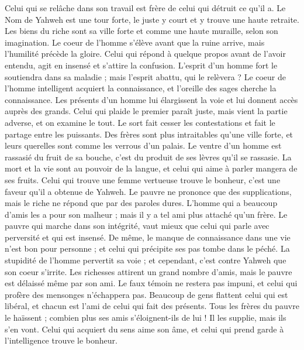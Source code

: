 \begin{multicols}{2}
Celui qui se relâche dans son travail est frère de celui qui détruit ce qu'il a.
Le Nom de Yahweh est une tour forte, le juste y court et y trouve une haute retraite.
Les biens du riche sont sa ville forte et comme une haute muraille, selon son imagination.
Le coeur de l'homme s'élève avant que la ruine arrive, mais l'humilité précède la gloire.
Celui qui répond à quelque propos avant de l'avoir entendu, agit en insensé et s’attire la confusion.
L'esprit d'un homme fort le soutiendra dans sa maladie ; mais l'esprit abattu, qui le relèvera ?
Le coeur de l'homme intelligent acquiert la connaissance, et l'oreille des sages cherche la connaissance.
Les présents d'un homme lui élargissent la voie et lui donnent accès auprès des grands.
Celui qui plaide le premier paraît juste, mais vient la partie adverse, et on examine le tout.
Le sort fait cesser les contestations et fait le partage entre les puissants.
Des frères sont plus intraitables qu’une ville forte, et leurs querelles sont comme les verrous d'un palais.
Le ventre d’un homme est rassasié du fruit de sa bouche, c’est du produit de ses lèvres qu’il se rassasie.
La mort et la vie sont au pouvoir de la langue, et celui qui aime à parler mangera de ses fruits.
Celui qui trouve une femme vertueuse trouve le bonheur, c’est une faveur qu’il a obtenue de Yahweh.
Le pauvre ne prononce que des supplications, mais le riche ne répond que par des paroles dures.
L’homme qui a beaucoup d’amis les a pour son malheur ; mais il y a tel ami plus attaché qu'un frère.
\VerseOne{}Le pauvre qui marche dans son intégrité, vaut mieux que celui qui parle avec perversité et qui est insensé.
De même, le manque de connaissance dans une vie n'est bon pour personne ; et celui qui précipite ses pas tombe dans le péché.
La stupidité de l'homme pervertit sa voie ; et cependant, c’est contre Yahweh que son coeur s’irrite.
Les richesses attirent un grand nombre d'amis, mais le pauvre est délaissé même par son ami.
Le faux témoin ne restera pas impuni, et celui qui profère des mensonges n'échappera pas.
Beaucoup de gens flattent celui qui est libéral, et chacun est l’ami de celui qui fait des présents.
Tous les frères du pauvre le haïssent ; combien plus ses amis s’éloignent-ils de lui ! Il les supplie, mais ils s’en vont.
Celui qui acquiert du sens aime son âme, et celui qui prend garde à l'intelligence trouve le bonheur.

\end{multicols}
